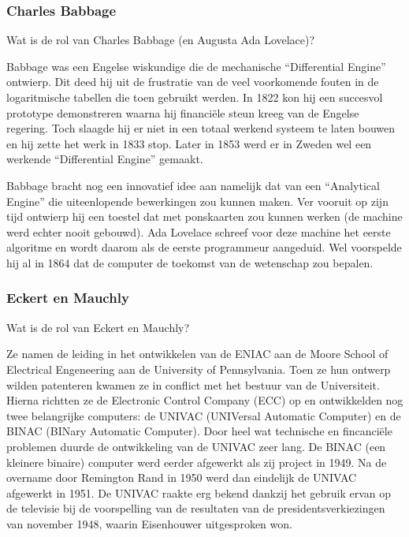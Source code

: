\documentclass[../main.tex]{subfiles}
\begin{document}
\subsubsection{Charles Babbage}
\begin{question}
Wat is de rol van Charles Babbage (en Augusta Ada Lovelace)?
\end{question}
\begin{solution}
Babbage was een Engelse wiskundige die de mechanische ``Differential Engine'' ontwierp.
Dit deed hij uit de frustratie van de veel voorkomende fouten in de logaritmische tabellen die toen gebruikt werden.
In 1822 kon hij een succesvol prototype demonstreren waarna hij financi\"ele steun kreeg van de Engelse regering.
Toch slaagde hij er niet in een totaal werkend systeem te laten bouwen en hij zette het werk in 1833 stop.
Later in 1853 werd er in Zweden wel een werkende ``Differential Engine'' gemaakt.

Babbage bracht nog een innovatief idee aan namelijk dat van een ``Analytical Engine'' die uiteenlopende bewerkingen zou kunnen maken.
Ver vooruit op zijn tijd ontwierp hij een toestel dat met ponskaarten zou kunnen werken (de machine werd echter nooit gebouwd).
Ada Lovelace schreef voor deze machine het eerste algoritme en wordt daarom als de eerste programmeur aangeduid.
Wel voorspelde hij al in 1864 dat de computer de toekomst van de wetenschap zou bepalen.
\end{solution}

\subsubsection{Eckert en Mauchly}
\begin{question}
Wat is de rol van Eckert en Mauchly?
\end{question}
\begin{solution}
Ze namen de leiding in het ontwikkelen van de ENIAC aan de Moore School of Electrical Engeneering aan de University of Pennsylvania.
Toen ze hun ontwerp wilden patenteren kwamen ze in conflict met het bestuur van de Universiteit.
Hierna richtten ze de Electronic Control Company (ECC) op en ontwikkelden nog twee belangrijke computers: de UNIVAC (UNIVersal Automatic Computer) en de BINAC (BINary Automatic Computer).
Door heel wat technische en fincanci\"ele problemen duurde de ontwikkeling van de UNIVAC zeer lang.
De BINAC (een kleinere binaire) computer werd eerder afgewerkt als zij project in 1949.
Na de overname door Remington Rand in 1950 werd dan eindelijk de UNIVAC afgewerkt in 1951.
De UNIVAC raakte erg bekend dankzij het gebruik ervan op de televisie bij de voorspelling van de resultaten van de presidentsverkiezingen van november 1948, waarin Eisenhouwer uitgesproken won.
\end{solution}
\end{document}
